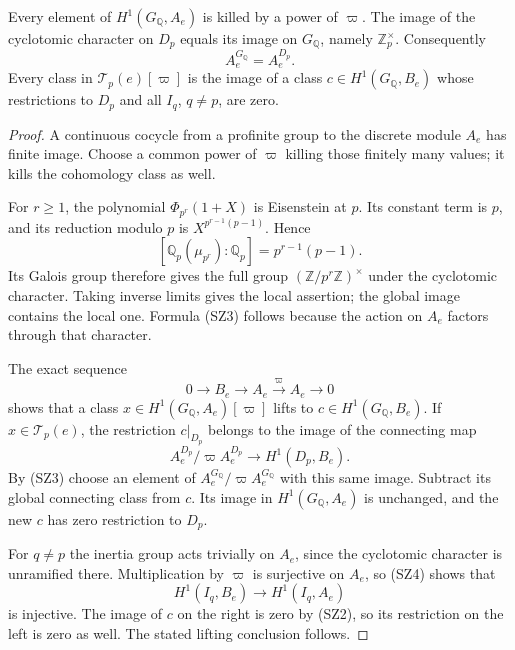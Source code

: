 \begin{lemma}\label{sz-torsion-and-local}
Every element of $H^1(G_{\mathbb Q},A_e)$ is killed by a
power of $\varpi$. The image of the cyclotomic character
on $D_p$ equals its image on $G_{\mathbb Q}$, namely
$\mathbb Z_p^\times$. Consequently
\[
                         A_e^{G_{\mathbb Q}}=A_e^{D_p}.
                                                               \tag{SZ3}
\]
Every class in $\mathcal T_p(e)[\varpi]$
is the image of a class $c\in H^1(G_{\mathbb Q},B_e)$
whose restrictions to $D_p$ and all $I_q$, $q\ne p$,
are zero.
\end{lemma}
\begin{proof}
A continuous cocycle from a profinite group to the discrete
module $A_e$ has finite image. Choose a common power of
$\varpi$ killing those finitely many values; it kills the
cohomology class as well.

For $r\ge1$, the polynomial $\Phi_{p^r}(1+X)$ is Eisenstein
at $p$. Its constant term is $p$, and its reduction modulo
$p$ is $X^{p^{r-1}(p-1)}$. Hence
\[
 [\mathbb Q_p(\mu_{p^r}):\mathbb Q_p]=p^{r-1}(p-1).
\]
Its Galois group therefore gives the full group
$(\mathbb Z/p^r\mathbb Z)^\times$ under the cyclotomic
character. Taking inverse limits gives the local assertion;
the global image contains the local one. Formula (SZ3)
follows because the action on $A_e$ factors through that
character.

The exact sequence
\[
 0\longrightarrow B_e\longrightarrow A_e
          \xrightarrow{\,\varpi\,}A_e\longrightarrow0    \tag{SZ4}
\]
shows that a class $x\in H^1(G_{\mathbb Q},A_e)[\varpi]$
lifts to $c\in H^1(G_{\mathbb Q},B_e)$. If $x\in
\mathcal T_p(e)$, the restriction $c|_{D_p}$ belongs to
the image of the connecting map
\[
 A_e^{D_p}/\varpi A_e^{D_p}\longrightarrow H^1(D_p,B_e).
\]
By (SZ3) choose an element of
$A_e^{G_{\mathbb Q}}/\varpi A_e^{G_{\mathbb Q}}$ with
this same image. Subtract its global connecting class from
$c$. Its image in $H^1(G_{\mathbb Q},A_e)$ is unchanged,
and the new $c$ has zero restriction to $D_p$.

For $q\ne p$ the inertia group acts trivially on $A_e$,
since the cyclotomic character is unramified there.
Multiplication by $\varpi$ is surjective on $A_e$, so
(SZ4) shows that
\[
                     H^1(I_q,B_e)\longrightarrow H^1(I_q,A_e)
\]
is injective. The image of $c$ on the right is zero by
(SZ2), so its restriction on the left is zero as well.
The stated lifting conclusion follows.
\end{proof}

